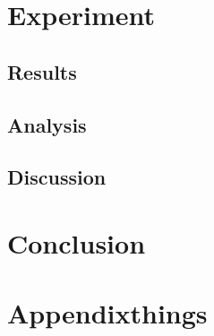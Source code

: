 \documentclass[a4paper,cleardoubleempty,BCOR1cm]{scrbook}
\begin{document}
\chapter{Experiment}

\section{Results}

\section{Analysis}

\section{Discussion}


\chapter{Conclusion}


\appendix
\chapter{Appendixthings}



\end{document}
